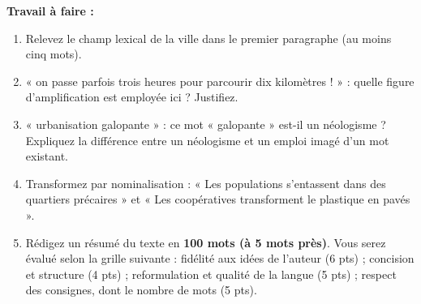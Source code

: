 \documentclass[11pt]{article}
\begin{document}
\begin{exercice}
\textbf{Travail à faire :}
\begin{enumerate}
\item Relevez le champ lexical de la ville dans le premier paragraphe (au moins cinq mots).
\item « on passe parfois trois heures pour parcourir dix kilomètres ! » : quelle figure d'amplification est employée ici ? Justifiez.
\item « urbanisation galopante » : ce mot « galopante » est-il un néologisme ? Expliquez la différence entre un néologisme et un emploi imagé d'un mot existant.
\item Transformez par nominalisation : « Les populations s'entassent dans des quartiers précaires » et « Les coopératives transforment le plastique en pavés ».
\item Rédigez un résumé du texte en \textbf{100 mots (à 5 mots près)}. Vous serez évalué selon la grille suivante : fidélité aux idées de l'auteur (6 pts) ; concision et structure (4 pts) ; reformulation et qualité de la langue (5 pts) ; respect des consignes, dont le nombre de mots (5 pts).
\end{enumerate}
\end{exercice}
\end{document}
